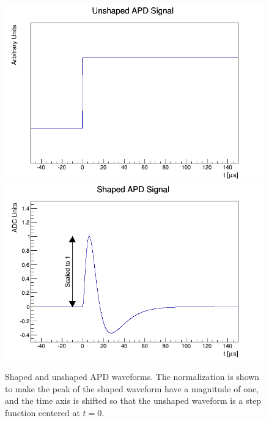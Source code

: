 \begin{figure}
\begin{center}
\includegraphics[keepaspectratio=true,width=\textwidth]{scripts/UnshapedAPDWaveform.png}
\includegraphics[keepaspectratio=true,width=\textwidth]{scripts/ShapedAPDWaveform.png}
\end{center}
\renewcommand{\baselinestretch}{1}
\small\normalsize
\begin{quote}
\caption{Shaped and unshaped APD waveforms.  The normalization is shown to make the peak of the shaped waveform have a magnitude of one, and the time axis is shifted so that the unshaped waveform is a step function centered at $t=0$.}
\label{fig:SampleAPDTemplates}
\end{quote}
\end{figure}
\renewcommand{\baselinestretch}{2}
\small\normalsize

